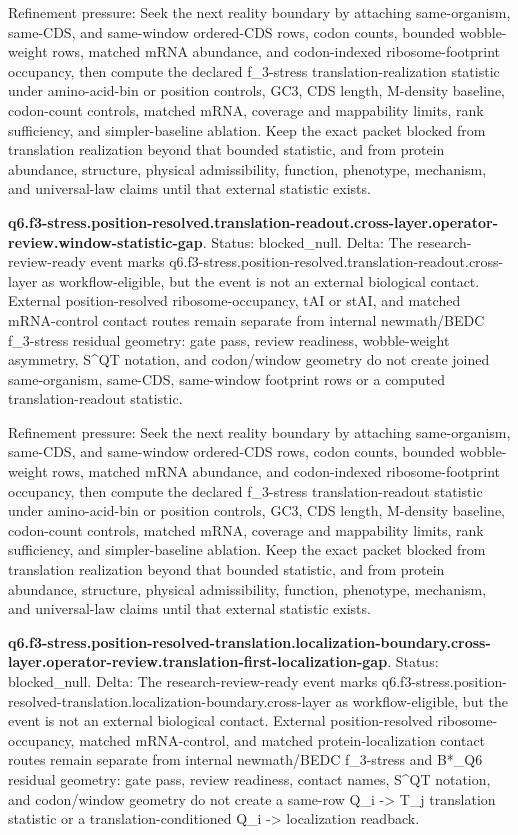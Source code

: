 Refinement pressure: Seek the next reality boundary by attaching same-organism, same-CDS, and same-window ordered-CDS rows, codon counts, bounded wobble-weight rows, matched mRNA abundance, and codon-indexed ribosome-footprint occupancy, then compute the declared f\_3-stress translation-realization statistic under amino-acid-bin or position controls, GC3, CDS length, M-density baseline, codon-count controls, matched mRNA, coverage and mappability limits, rank sufficiency, and simpler-baseline ablation. Keep the exact packet blocked from translation realization beyond that bounded statistic, and from protein abundance, structure, physical admissibility, function, phenotype, mechanism, and universal-law claims until that external statistic exists.

\textbf{q6.f3-stress.position-resolved.translation-readout.cross-layer.operator-review.window-statistic-gap}. Status: blocked\_null. Delta: The research-review-ready event marks q6.f3-stress.position-resolved.translation-readout.cross-layer as workflow-eligible, but the event is not an external biological contact. External position-resolved ribosome-occupancy, tAI or stAI, and matched mRNA-control contact routes remain separate from internal newmath/BEDC f\_3-stress residual geometry: gate pass, review readiness, wobble-weight asymmetry, S\textasciicircum{}QT notation, and codon/window geometry do not create joined same-organism, same-CDS, same-window footprint rows or a computed translation-readout statistic.

Refinement pressure: Seek the next reality boundary by attaching same-organism, same-CDS, and same-window ordered-CDS rows, codon counts, bounded wobble-weight rows, matched mRNA abundance, and codon-indexed ribosome-footprint occupancy, then compute the declared f\_3-stress translation-readout statistic under amino-acid-bin or position controls, GC3, CDS length, M-density baseline, codon-count controls, matched mRNA, coverage and mappability limits, rank sufficiency, and simpler-baseline ablation. Keep the exact packet blocked from translation realization beyond that bounded statistic, and from protein abundance, structure, physical admissibility, function, phenotype, mechanism, and universal-law claims until that external statistic exists.

\textbf{q6.f3-stress.position-resolved-translation.localization-boundary.cross-layer.operator-review.translation-first-localization-gap}. Status: blocked\_null. Delta: The research-review-ready event marks q6.f3-stress.position-resolved-translation.localization-boundary.cross-layer as workflow-eligible, but the event is not an external biological contact. External position-resolved ribosome-occupancy, matched mRNA-control, and matched protein-localization contact routes remain separate from internal newmath/BEDC f\_3-stress and B*\_Q6 residual geometry: gate pass, review readiness, contact names, S\textasciicircum{}QT notation, and codon/window geometry do not create a same-row Q\_i -> T\_j translation statistic or a translation-conditioned Q\_i -> localization readback.

